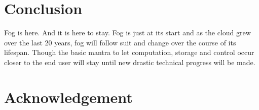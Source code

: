 \section{Conclusion}

Fog is here. And it is here to stay. Fog is just at its start and as the cloud grew over the last 20 years, fog will follow suit and change over the course of its lifespan. Though the basic mantra to let computation, storage and control occur closer to the end user will stay until new drastic technical progress will be made.


\section{Acknowledgement}